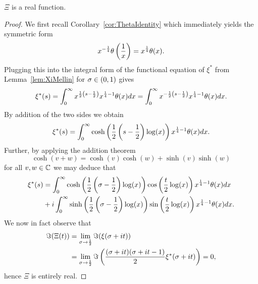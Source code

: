 \begin{lemma}
	$\Xi$ is a real function.
\end{lemma}
\begin{proof}
	We first recall Corollary~\ref{cor:ThetaIdentity} which immediately yields the symmetric form
\begin{equation*}
	x^{-\frac{1}{4}} \theta\left(\frac{1}{x}\right) = x^{\frac{1}{4}} \theta(x).
\end{equation*}
	Plugging this into the integral form of the functional equation of $\xi^*$ from Lemma~\ref{lem:XiMellin} for $\sigma \in \left(0, 1\right)$ gives
\begin{equation*}
	\xi^*(s) = \int _0 ^\infty x^{\frac{1}{2}\left(s - \frac{1}{2}\right)} x^{\frac{1}{4} - 1} \theta(x) dx = \int _0 ^\infty x^{-\frac{1}{2}\left(s - \frac{1}{2}\right)} x^{\frac{1}{4} - 1} \theta(x) dx.
\end{equation*}
	By addition of the two sides we obtain
\begin{equation*}
	\xi^*(s) = \int _0 ^\infty \cosh\left(\frac{1}{2} \left(s - \frac{1}{2}\right) \log(x)\right) x^{\frac{1}{4} - 1} \theta(x) dx.
\end{equation*}
	Further, by applying the addition theorem
\begin{equation*}
	\cosh(v + w) = \cosh(v)\cosh(w) + \sinh(v) \sinh(w)
\end{equation*}	
	for all $v,w \in \mathbb{C}$ we may deduce that
\begin{equation*}
\begin{aligned}	
	\xi^*(s) 
		&= \int _0 ^\infty \cosh\left(\frac{1}{2} \left(\sigma - \frac{1}{2}\right) \log(x)\right) \cos\left(\frac{t}{2} \log(x)\right) x^{\frac{1}{4} - 1} \theta(x) dx \\
		&+ i\int _0 ^\infty \sinh\left(\frac{1}{2} \left(\sigma - \frac{1}{2}\right) \log(x)\right) \sin\left(\frac{t}{2} \log(x)\right) x^{\frac{1}{4} - 1} \theta(x) dx.
\end{aligned}
\end{equation*}
	We now in fact observe that
\begin{equation*}
\begin{aligned}	
	\Im(\Xi(t)) 
	&= \lim _{\sigma \to \frac{1}{2}} \Im(\xi(\sigma + it)) \\
	&= \lim _{\sigma \to \frac{1}{2}} \Im\left(\frac{(\sigma + it)(\sigma + it - 1)}{2}\xi^*(\sigma + it)\right) = 0,
\end{aligned}
\end{equation*}
	hence $\Xi$ is entirely real.
\end{proof}


